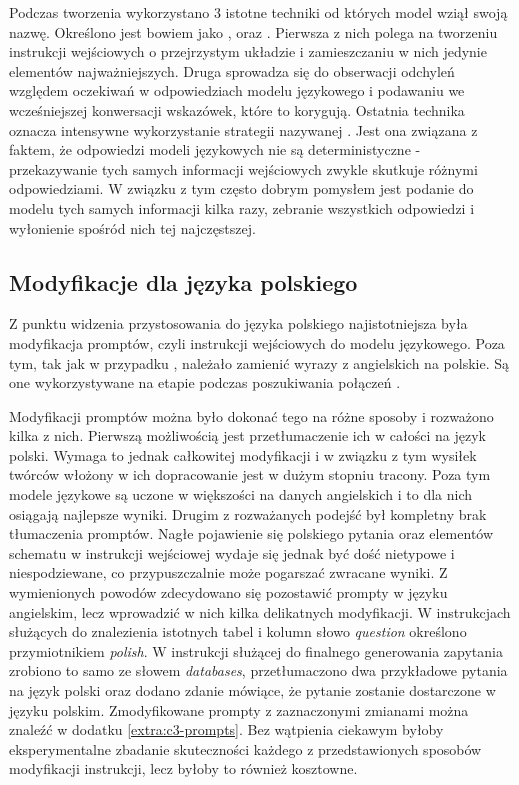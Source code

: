 Podczas tworzenia  wykorzystano 3 istotne techniki od których model wziął swoją nazwę. Określono jest bowiem jako ,  oraz . Pierwsza z nich polega na tworzeniu instrukcji wejściowych o przejrzystym układzie i zamieszczaniu w nich jedynie elementów najważniejszych. Druga sprowadza się do obserwacji odchyleń względem oczekiwań w odpowiedziach modelu językowego i podawaniu we wcześniejszej konwersacji wskazówek, które to korygują. Ostatnia technika oznacza intensywne wykorzystanie strategii nazywanej  \cite{Wang2022Consistency}. Jest ona związana z faktem, że odpowiedzi modeli językowych nie są deterministyczne - przekazywanie tych samych informacji wejściowych zwykle skutkuje różnymi odpowiedziami. W związku z tym często dobrym pomysłem jest podanie do modelu tych samych informacji kilka razy, zebranie wszystkich odpowiedzi i wyłonienie spośród nich tej najczęstszej.

\subsection{Modyfikacje dla języka polskiego}
Z punktu widzenia przystosowania  do języka polskiego najistotniejsza była modyfikacja promptów, czyli instrukcji wejściowych do modelu językowego. Poza tym, tak jak w przypadku , należało zamienić wyrazy  z angielskich na polskie. Są one wykorzystywane na etapie  podczas poszukiwania połączeń .

Modyfikacji promptów można było dokonać tego na różne sposoby i rozważono kilka z nich. Pierwszą możliwością jest przetłumaczenie ich w całości na język polski. Wymaga to jednak całkowitej modyfikacji i w związku z tym wysiłek twórców  włożony w ich dopracowanie jest w dużym stopniu tracony. Poza tym modele językowe są uczone w większości na danych angielskich i to dla nich osiągają najlepsze wyniki. Drugim z rozważanych podejść był kompletny brak tłumaczenia promptów. Nagłe pojawienie się polskiego pytania oraz elementów schematu w instrukcji wejściowej wydaje się jednak być dość nietypowe i niespodziewane, co przypuszczalnie może pogarszać zwracane wyniki. Z wymienionych powodów zdecydowano się pozostawić prompty w języku angielskim, lecz wprowadzić w nich kilka delikatnych modyfikacji. W instrukcjach służących do znalezienia istotnych tabel i kolumn słowo \textit{question} określono przymiotnikiem \textit{polish}. W instrukcji służącej do finalnego generowania zapytania zrobiono to samo ze słowem \textit{databases}, przetłumaczono dwa przykładowe pytania na język polski oraz dodano zdanie mówiące, że pytanie zostanie dostarczone w języku polskim. Zmodyfikowane prompty z zaznaczonymi zmianami można znaleźć w dodatku \ref{extra:c3-prompts}. Bez wątpienia ciekawym byłoby eksperymentalne zbadanie skuteczności każdego z przedstawionych sposobów modyfikacji instrukcji, lecz byłoby to również kosztowne.


